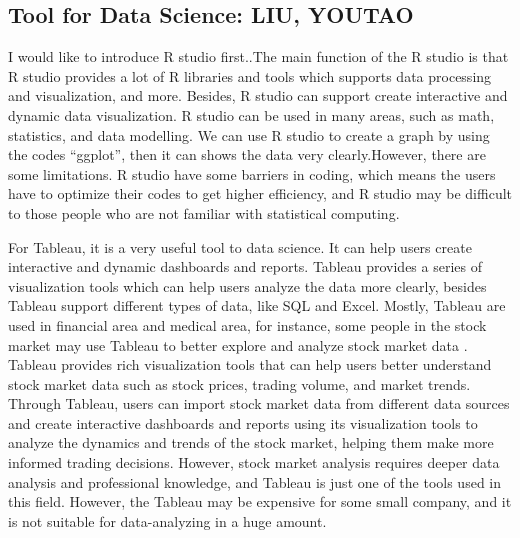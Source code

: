 \documentclass[a4paper, 11pt]{report}
\begin{document}
\subsection{Tool for Data Science: LIU, YOUTAO}
I would like to introduce R studio first..The main function of the R studio is that R studio provides a lot of R libraries and tools which supports data processing and visualization, and more. Besides, R studio can support create interactive and dynamic data visualization. R studio can be used in many areas, such as math, statistics, and data modelling. We can use R studio to create a graph by using the codes  “ggplot”, then it can shows the data very clearly\cite{Jianshu}.However, there are some limitations. R studio have some barriers in coding, which means the users have to optimize their codes to get higher efficiency, and R studio may be difficult to those people who are not familiar with statistical computing\cite{B}.

For Tableau, it is a very useful tool to data science. It can help users create interactive and dynamic dashboards and reports. Tableau provides a series of visualization tools which can help users analyze the data more clearly, besides Tableau support different types of data, like SQL and Excel. Mostly, Tableau are used in financial area and medical area, for instance, some people in the stock market may use Tableau to better explore and analyze stock market data\cite{Tableau} . Tableau provides rich visualization tools that can help users better understand stock market data such as stock prices, trading volume, and market trends. Through Tableau, users can import stock market data from different data sources and create interactive dashboards and reports using its visualization tools to analyze the dynamics and trends of the stock market, helping them make more informed trading decisions. However, stock market analysis requires deeper data analysis and professional knowledge, and Tableau is just one of the tools used in this field. However, the Tableau may be expensive for some small company, and it is not suitable for data-analyzing in a huge amount\cite{VG}.
\end{document}
